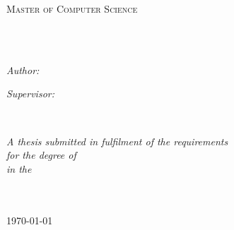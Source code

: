 \documentclass[11pt, english, openany, singlespacing, headsepline]{classes/ResearchTopic}
\author{Teklit \textsc{Haphtu}} %
\begin{document}
\frontmatter %

\pagestyle{plain} %


\begin{titlepage}
\begin{center}

\vspace*{.06\textheight}
{\scshape\LARGE \univname\par}\vspace{1.5cm} %
\textsc{\Large Master of Computer Science}\\[0.5cm] %

\HRule \\[0.4cm] %
{\huge \bfseries \ttitle\par}\vspace{0.4cm} %
\HRule \\[1.5cm] %
 
\begin{minipage}[t]{0.4\textwidth}
\begin{flushleft} \large
\emph{Author:}\\
\href{http://www.teklithaphtu.com}{\authorname} %
\end{flushleft}
\end{minipage}
\begin{minipage}[t]{0.4\textwidth}
\begin{flushright} \large
\emph{Supervisor:} \\
\href{https://people.utwente.nl/m.elhajj}{\supname} %
\end{flushright}
\end{minipage}\\[3cm]
 
\vfill

\large \textit{A thesis submitted in fulfilment of the requirements\\ for the degree of \degreename}\\[0.3cm] %
\textit{in the}\\[0.4cm]
\groupname\\\deptname\\[2cm] %

\vfill

{\large \today}\\[4cm] %
 
\vfill
\end{center}
\end{titlepage}
\end{document}

